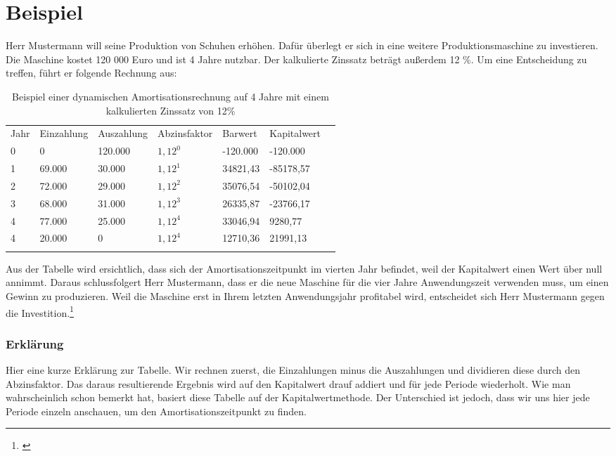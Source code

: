 \section{Beispiel}
Herr Mustermann will seine Produktion von Schuhen erhöhen. Dafür überlegt er sich in eine weitere Produktionsmaschine zu investieren. Die Maschine kostet 120 000 Euro und ist 4 Jahre nutzbar. Der kalkulierte Zinssatz beträgt außerdem 12 \%. Um eine Entscheidung zu treffen, führt er folgende Rechnung aus:

\begin{table}[!h]
    \begin{tabular}{lllllll}
        \cline{1-6} \rowcolor{gray}
        Jahr & Einzahlung & Auszahlung & Abzinsfaktor & Barwert  & Kapitalwert \\ \cline{1-6} \rowcolor{white}
        0    & 0          & 120.000    & $1,12^0$     & -120.000 & -120.000    \\ \cline{1-6} \rowcolor{white}
        1    & 69.000     & 30.000     & $1,12^1$     & 34821,43 & -85178,57   \\ \cline{1-6} \rowcolor{white}
        2    & 72.000     & 29.000     & $1,12^2$     & 35076,54 & -50102,04   \\ \cline{1-6} \rowcolor{white}
        3    & 68.000     & 31.000     & $1,12^3$     & 26335,87 & -23766,17   \\ \cline{1-6} \rowcolor{white}
        4    & 77.000     & 25.000     & $1,12^4$     & 33046,94 & 9280,77     \\ \cline{1-6} \rowcolor{white}
        4    & 20.000     & 0          & $1,12^4$     & 12710,36 & 21991,13    \\ \cline{1-6} \rowcolor{white}
    \end{tabular}
    \caption{Beispiel einer dynamischen Amortisationsrechnung auf 4 Jahre mit einem kalkulierten Zinssatz von 12\%}\label{tb:dynamische Amortisationsrechnung}
\end{table}
\bigskip
\noindent
Aus der Tabelle wird ersichtlich, dass sich der Amortisationszeitpunkt im vierten Jahr befindet, weil der Kapitalwert einen Wert über null annimmt. Daraus schlussfolgert Herr Mustermann, dass er die neue Maschine für die vier Jahre Anwendungszeit verwenden muss, um einen Gewinn zu produzieren. Weil die Maschine erst in Ihrem letzten Anwendungsjahr profitabel wird, entscheidet sich Herr Mustermann gegen die Investition.\footnote{\cite{payoff}}
\subsubsection{Erklärung}
Hier eine kurze Erklärung zur Tabelle. Wir rechnen zuerst, die Einzahlungen minus die Auszahlungen und dividieren diese durch den Abzinsfaktor. Das daraus resultierende Ergebnis wird auf den Kapitalwert drauf addiert und für jede Periode wiederholt. Wie man wahrscheinlich schon bemerkt hat, basiert diese Tabelle auf der Kapitalwertmethode. Der Unterschied ist jedoch, dass wir uns hier jede Periode einzeln anschauen, um den Amortisationszeitpunkt zu finden.
